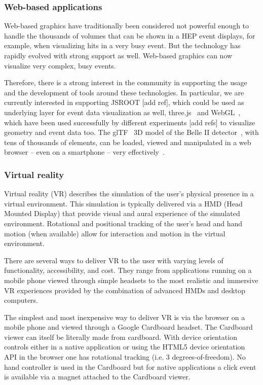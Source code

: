 \documentclass[12pt,a4paper]{article}
\begin{document}
\hypertarget{web-based}{%
\subsubsection{Web-based applications}\label{web-based}}

Web-based graphics have traditionally been considered not powerful enough to handle the thousands of volumes that can be
shown in a HEP event displays, for example, when visualizing hits in a very busy event. But the technology has rapidly
evolved with strong support as well. Web-based graphics can now visualize very complex, busy events.

Therefore, there is a strong interest in the community in supporting the usage and the development of tools around
these technologies. In particular, we are currently interested in supporting JSROOT [add ref], which could be used as
underlying layer for event data visualization as well, three.js~\cite{ThreeJSXXXX} and WebGL~\cite{WebGL2011}, which have been
used successfully by different experiments [add refs] to visualize geometry and event data too. The glTF~\cite{glTF} 3D model
of the Belle II detector~\cite{BelleII}, with tens of thousands of elements, can be loaded, viewed and manipulated in a web
browser – even on a smartphone – very effectively~\cite{SketchFabBelleII}.

\hypertarget{vr}{%
\subsubsection{Virtual reality}\label{vr}}

Virtual reality (VR) describes the simulation of the user’s physical presence in a virtual environment. This simulation
is typically delivered via a HMD (Head Mounted Display) that provide visual and aural experience of the simulated environment.
Rotational and positional tracking of the user’s head and hand motion (when available) allow for interaction and motion
in the virtual environment.

There are several ways to deliver VR to the user with varying levels of functionality, accessibility, and cost.
They range from applications running on a mobile phone viewed through simple headsets to the most realistic and
immersive VR experiences provided by the combination of advanced HMDs and desktop computers.

The simplest and most inexpensive way to deliver VR is via the browser on a mobile phone and viewed through a
Google Cardboard headset. The Cardboard viewer can itself be literally made from cardboard. With device orientation
controls either in a native application or using the HTML5 device orientation API in the browser one has rotational
tracking (i.e. 3 degrees-of-freedom). No hand controller is used in the Cardboard but for native applications a click event
is available via a magnet attached to the Cardboard viewer.
\end{document}
